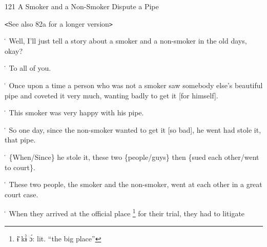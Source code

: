 
121 A Smoker and a Non-Smoker Dispute a Pipe

\texttt{<}See also 82a for a longer version\texttt{>}

\. Well, I'll just tell a story about a smoker and a non-smoker in the old days,
okay?

\. To all of you.

\. Once upon a time a person who was not a smoker saw somebody else's beautiful
pipe and coveted it very much, wanting badly to get it [for himself].

\. This smoker was very happy with his pipe.

\. So one day, since the non-smoker wanted to get it [so bad], he went had stole
it, that pipe.

\. \{When/Since\} he stole it, these two \{people/guys\} then \{sued each other/went
to court\}.

\. These two people, the smoker and the non-smoker, went at each other in a great
court case.

\. When they arrived at the official place \footnote{ɨ̄ kɨ̀ ɔ́: lit. ``the big place''} for their trial, they had to litigate
